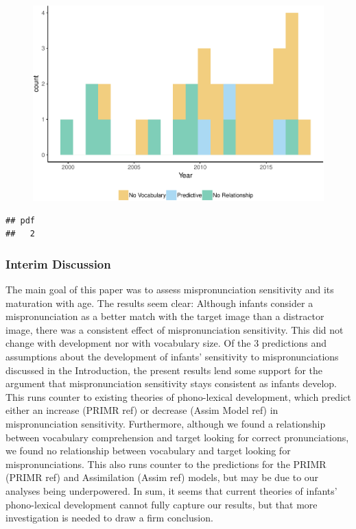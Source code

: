 \documentclass[man]{apa6}
\theoremstyle{definition}
\theoremstyle{definition}
\theoremstyle{definition}
\theoremstyle{remark}
\begin{document}
\begin{figure}
\centering
\includegraphics{Paper_Analyses_files/figure-latex/Vocab_describe1-1.pdf}
\caption{}
\end{figure}

\begin{verbatim}
## pdf 
##   2
\end{verbatim}

\subsubsection{Interim Discussion}\label{interim-discussion}

The main goal of this paper was to assess mispronunciation sensitivity
and its maturation with age. The results seem clear: Although infants
consider a mispronunciation as a better match with the target image than
a distractor image, there was a consistent effect of mispronunciation
sensitivity. This did not change with development nor with vocabulary
size. Of the 3 predictions and assumptions about the development of
infants' sensitivity to mispronunciations discussed in the Introduction,
the present results lend some support for the argument that
mispronunciation sensitivity stays consistent as infants develop. This
runs counter to existing theories of phono-lexical development, which
predict either an increase (PRIMR ref) or decrease (Assim Model ref) in
mispronunciation sensitivity. Furthermore, although we found a
relationship between vocabulary comprehension and target looking for
correct pronunciations, we found no relationship between vocabulary and
target looking for mispronunciations. This also runs counter to the
predictions for the PRIMR (PRIMR ref) and Assimilation (Assim ref)
models, but may be due to our analyses being underpowered. In sum, it
seems that current theories of infants' phono-lexical development cannot
fully capture our results, but that more investigation is needed to draw
a firm conclusion.
\end{document}
